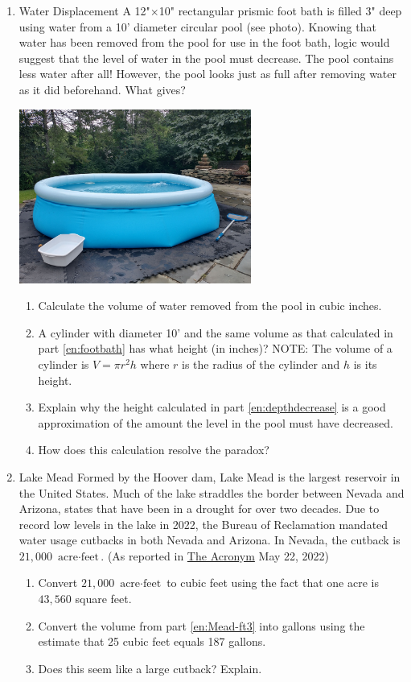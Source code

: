 \begin{enumerate}

\item Water Displacement A 12"$\times$10" rectangular prismic foot bath is filled 3" deep using water from a 10' diameter circular pool (see photo). Knowing that water has been removed from the pool for use in the foot bath, logic would suggest that the level of water in the pool must decrease. The pool contains less water after all! However, the pool looks just as full after removing water as it did beforehand. What gives?
	\begin{center}\includegraphics[width=3in]{images/pool}\end{center}
	\begin{enumerate}
		\item \label{en:footbath}Calculate the volume of water removed from the pool in cubic inches.
		\item \label{en:depthdecrease}A cylinder with diameter 10' and the same volume as that calculated in part \ref{en:footbath} has what height (in inches)? NOTE: The volume of a cylinder is $V=\pi r^2h$ where $r$ is the radius of the cylinder and $h$ is its height.
		\item Explain why the height calculated in part \ref{en:depthdecrease} is a good approximation of the amount the level in the pool must have decreased.
		\item How does this calculation resolve the paradox?
	\end{enumerate}

\item Lake Mead Formed by the Hoover dam, Lake Mead is the largest reservoir in the United States. Much of the lake straddles the border between Nevada and Arizona, states that have been in a drought for over two decades. Due to record low levels in the lake in 2022, the Bureau of Reclamation mandated water usage cutbacks in both Nevada and Arizona. In Nevada, the cutback is $21,000$ $\text{acre}\cdot\text{feet}$. (As reported in \href{https://sites.imsa.edu/acronym/2022/05/22/the-drought-affecting-lake-mead/}{The Acronym} May 22, 2022)
	\begin{enumerate}
		\item \label{en:Mead-ft3}Convert $21,000$ $\text{acre}\cdot\text{feet}$ to cubic feet using the fact that one acre is $43,560$ square feet.
		\item Convert the volume from part \ref{en:Mead-ft3} into gallons using the estimate that 25 cubic feet equals 187 gallons.
		\item Does this seem like a large cutback? Explain.
	\end{enumerate}


\end{enumerate}
